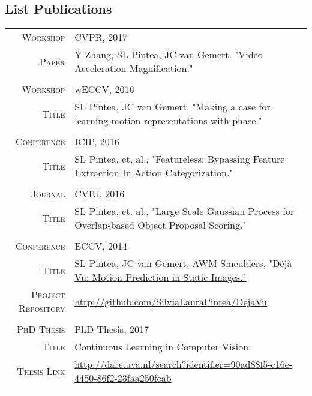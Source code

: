 \documentclass[a4paper, oneside, final]{scrartcl}
\newcommand{\gray}{\rowcolor[gray]{.90}}
\begin{document}
\begin{center}
		\section{List Publications}
		\begin{tabular}{r@{\hskip 0.3in}p{11.3cm}}
			\gray \textsc{Workshop} & CVPR, 2017\\
			\textsc{Paper}			& Y Zhang, SL Pintea, JC van Gemert. "Video Acceleration Magnification."\\ 
			\multicolumn{2}{c}{}\\
			\gray \textsc{Workshop} & wECCV, 2016\\
			\textsc{Title}			& SL Pintea, JC van Gemert, "Making a case for learning motion representations with phase."\\ 
			\multicolumn{2}{c}{}\\
			\gray \textsc{Conference}    & ICIP, 2016\\ 
					\textsc{Title}		 & SL Pintea, et, al., "Featureless: Bypassing Feature Extraction In Action Categorization."\\
			\multicolumn{2}{c}{}\\
			\gray \textsc{Journal}       & CVIU, 2016\\
				\textsc{Title}			 & SL Pintea, et. al., "Large Scale Gaussian Process for Overlap-based Object Proposal Scoring."\\	
			\multicolumn{2}{c}{}\\
			\gray \textsc{Conference}   & ECCV, 2014\\
				\textsc{Title}			& \href{https://staff.fnwi.uva.nl/s.l.pintea/dejavu/}{SL Pintea, JC van Gemert, AWM Smeulders, "D\'{e}j\`{a} Vu: Motion Prediction in Static Images."}\\	
			\textsc{Project Repository}  & \small\href{http://github.com/SilviaLauraPintea/DejaVu}
				{http://github.com/SilviaLauraPintea/DejaVu}\\ 
			\multicolumn{2}{c}{}\\
			\gray \textsc{PhD Thesis} & PhD Thesis, 2017\\
			\textsc{Title}			  & Continuous Learning in Computer Vision.\\ 
			\textsc{Thesis Link}      & \small\href{http://dare.uva.nl/search?identifier=90ad88f5-c16e-4450-86f2-23faa250fcab}
					{http://dare.uva.nl/search?identifier=90ad88f5-c16e-4450-86f2-23faa250fcab}\\
			\multicolumn{2}{c}{}\\
		\end{tabular}

\end{center}
\end{document}
